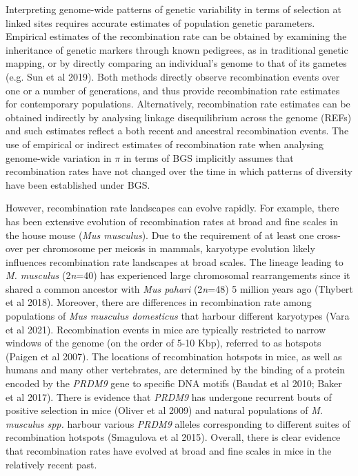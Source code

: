 \documentclass[10pt,twoside, twocolumn]{GSA_format}
\begin{document}
\vspace{5px}

Interpreting genome-wide patterns of genetic variability in terms of selection at linked sites requires accurate estimates of population genetic parameters. Empirical estimates of the recombination rate can be obtained by examining the inheritance of genetic markers through known pedigrees, as in traditional genetic mapping, or by directly comparing an individual's genome to that of its gametes (e.g. Sun et al 2019). Both methods directly observe recombination events over one or a number of generations, and thus provide recombination rate estimates for contemporary populations. Alternatively, recombination rate estimates can be obtained indirectly by analysing linkage disequilibrium across the genome (REFs) and such estimates reflect a both recent and ancestral recombination events. The use of empirical or indirect estimates of recombination rate when analysing genome-wide variation in $\pi$ in terms of BGS implicitly assumes that recombination rates have not changed over the time in which patterns of diversity have been established under BGS.

\vspace{5px}

However, recombination rate landscapes can evolve rapidly. For example, there has been extensive evolution of recombination rates at broad and fine scales in the house mouse (\textit{Mus musculus}). Due to the requirement of at least one cross-over per chromosome per meiosis in mammals, karyotype evolution likely influences recombination rate landscapes at broad scales. The lineage leading to \textit{M. musculus}  (2\textit{n}=40) has experienced large chromosomal rearrangements since it shared a common ancestor with \textit{Mus pahari} (2\textit{n}=48) 5 million years ago (Thybert et al 2018). Moreover, there are differences in recombination rate among populations of \textit{Mus musculus domesticus} that harbour different karyotypes (Vara et al 2021). Recombination events in mice are typically restricted to narrow windows of the genome (on the order of 5-10 Kbp), referred to as hotspots (Paigen et al 2007). The locations of recombination hotspots in mice, as well as humans and many other vertebrates, are determined by the binding of a protein encoded by the \textit{PRDM9} gene to specific DNA motifs (Baudat et al 2010; Baker et al 2017). There is evidence that \textit{PRDM9} has undergone recurrent bouts of positive selection in mice (Oliver et al 2009) and natural populations of \textit{M. musculus spp.} harbour various \textit{PRDM9} alleles corresponding to different suites of recombination hotspots  (Smagulova et al 2015). Overall, there is clear evidence that recombination rates have evolved at broad and fine scales in mice in the relatively recent past. 
\end{document}
